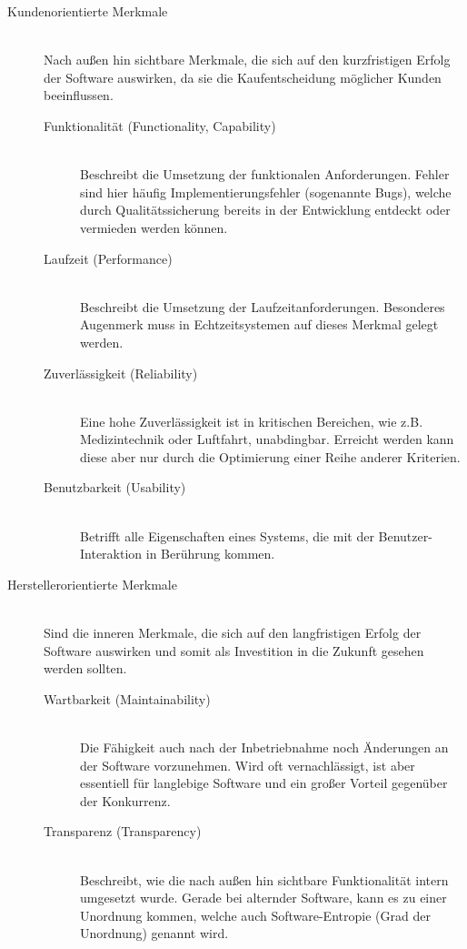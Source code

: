 \begin{description}
  \item[Kundenorientierte Merkmale] \hfill \\ Nach außen hin sichtbare Merkmale, die sich auf den kurzfristigen Erfolg der Software auswirken, da sie die Kaufentscheidung möglicher Kunden beeinflussen.
  \begin{description}
    \item[Funktionalität (Functionality, Capability)] \hfill \\ Beschreibt die Umsetzung der funktionalen Anforderungen. Fehler sind hier häufig Implementierungsfehler (sogenannte Bugs), welche durch Qualitätssicherung bereits in der Entwicklung entdeckt oder vermieden werden können. 
    \item[Laufzeit (Performance)] \hfill \\ Beschreibt die Umsetzung der Laufzeitanforderungen. Besonderes Augenmerk muss in Echtzeitsystemen auf dieses Merkmal gelegt werden.
    \item[Zuverlässigkeit (Reliability)] \hfill \\ Eine hohe Zuverlässigkeit ist in kritischen Bereichen, wie z.B. Medizintechnik oder Luftfahrt, unabdingbar. Erreicht werden kann diese aber nur durch die Optimierung einer Reihe anderer Kriterien.
    \item[Benutzbarkeit (Usability)] \hfill \\ Betrifft alle Eigenschaften eines Systems, die mit der Benutzer-Interaktion in Berührung kommen.
  \end{description}
  \item[Herstellerorientierte Merkmale] \hfill \\ Sind die inneren Merkmale, die sich auf den langfristigen Erfolg der Software auswirken und somit als Investition in die Zukunft gesehen werden sollten.
  \begin{description}
    \item[Wartbarkeit (Maintainability)] \hfill \\ Die Fähigkeit auch nach der Inbetriebnahme noch Änderungen an der Software vorzunehmen. Wird oft vernachlässigt, ist aber essentiell für langlebige Software und ein großer Vorteil gegenüber der Konkurrenz.
    \item[Transparenz (Transparency)] \hfill \\ Beschreibt, wie die nach außen hin sichtbare Funktionalität intern umgesetzt wurde. Gerade bei alternder Software, kann es zu einer Unordnung kommen, welche auch Software-Entropie (Grad der Unordnung) genannt wird.

\end{description}
\end{description}
